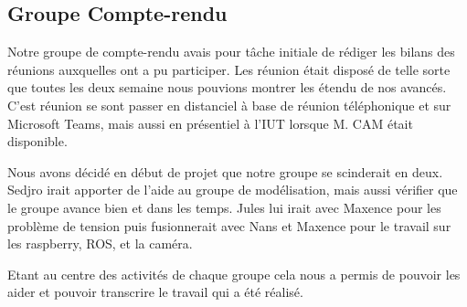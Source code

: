 \subsection{Groupe Compte-rendu}

Notre groupe de compte-rendu avais pour tâche initiale de rédiger les bilans des réunions auxquelles ont a pu participer. Les réunion était disposé de telle sorte que toutes les deux semaine nous pouvions montrer les étendu de nos avancés. C'est réunion se sont passer en distanciel à base de réunion téléphonique et sur Microsoft Teams, mais aussi en présentiel à l'IUT lorsque M. CAM était disponible.

Nous avons décidé en début de projet que notre groupe se scinderait en deux. Sedjro irait apporter de l'aide au groupe de modélisation, mais aussi vérifier que le groupe avance bien et dans les temps. Jules lui irait avec Maxence pour les problème de tension puis fusionnerait avec Nans et Maxence pour le travail sur les raspberry, ROS, et la caméra.

Etant au centre des activités de chaque groupe cela nous a permis de pouvoir les aider et pouvoir transcrire le travail qui a été réalisé.

